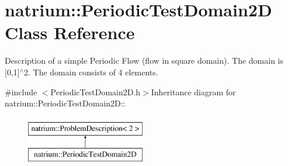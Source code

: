 \hypertarget{classnatrium_1_1PeriodicTestDomain2D}{
\section{natrium::PeriodicTestDomain2D Class Reference}
\label{classnatrium_1_1PeriodicTestDomain2D}
}


Description of a simple Periodic Flow (flow in square domain). The domain is \mbox{[}0,1\mbox{]}$^\wedge$2. The domain consists of 4 elements.  


{\ttfamily \#include $<$PeriodicTestDomain2D.h$>$}Inheritance diagram for natrium::PeriodicTestDomain2D::\begin{figure}[H]
\begin{center}
\leavevmode
\includegraphics[height=2cm]{classnatrium_1_1PeriodicTestDomain2D}
\end{center}
\end{figure}
